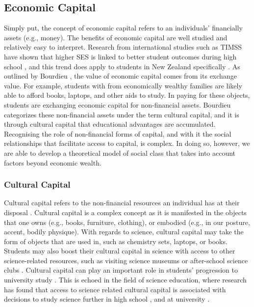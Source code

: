 \subsection*{Economic Capital}
Simply put, the concept of economic capital refers to an individuals' financially assets (e.g., money). The benefits of economic capital are well studied and relatively easy to interpret. Research from international studies such as TIMSS have shown that higher SES is linked to better student outcomes during high school \cite{Mullis_2012,mullis2016timss}, and this trend does apply to students in New Zealand specifically \cite{May_2016}. As outlined by Bourdieu \cite{Bourdieu_1986}, the value of economic capital comes from its exchange value. For example, students with from economically wealthy families are likely able to afford books, laptops, and other aids to study. In paying for these objects, students are exchanging economic capital for non-financial assets. Bourdieu categorizes these non-financial assets under the term cultural capital, and it is through cultural capital that educational advantages are accumulated. Recognising the role of non-financial forms of capital, and with it the social relationships that facilitate access to capital, is complex. In doing so, however, we are able to develop a theoretical model of social class that takes into account factors beyond economic wealth. 

\subsubsection*{Cultural Capital}
Cultural capital refers to the non-financial resources an individual has at their disposal \cite{Bourdieu_1986}. Cultural capital is a complex concept as it is manifested in the objects that one owns (e.g., books, furniture, clothing), or embodied (e.g., in our posture, accent, bodily physique). With regards to science, cultural capital may take the form of objects that are used in, such as chemistry sets, laptops, or books. Students may also boost their cultural capital in science with access to other science-related resources, such as visiting science museums \cite{Dawson2014} or after-school science clubs \cite{mujtaba2018students}. Cultural capital can play an important role in students' progression to university study \cite{aschaffenburg1997cultural}. This is echoed in the field of science education, where research has found that access to science related cultural capital is associated with decisions to study science further in high school \cite{mujtaba2018students}, and at university \cite{Lyons_2006}.

